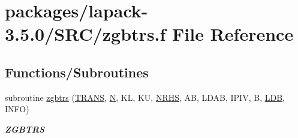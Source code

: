 \hypertarget{zgbtrs_8f}{}\section{packages/lapack-\/3.5.0/\+S\+R\+C/zgbtrs.f File Reference}
\label{zgbtrs_8f}
\subsection*{Functions/\+Subroutines}
\begin{DoxyCompactItemize}
\item 
subroutine \hyperlink{group__complex16GBcomputational_gaf3a96e7f621f139aa2750ae380e83700}{zgbtrs} (\hyperlink{superlu__enum__consts_8h_a0c4e17b2d5cea33f9991ccc6a6678d62a1f61e3015bfe0f0c2c3fda4c5a0cdf58}{T\+R\+A\+N\+S}, \hyperlink{polmisc_8c_a0240ac851181b84ac374872dc5434ee4}{N}, K\+L, K\+U, \hyperlink{example__user_8c_aa0138da002ce2a90360df2f521eb3198}{N\+R\+H\+S}, A\+B, L\+D\+A\+B, I\+P\+I\+V, B, \hyperlink{example__user_8c_a50e90a7104df172b5a89a06c47fcca04}{L\+D\+B}, I\+N\+F\+O)
\begin{DoxyCompactList}\small\item\em {\bfseries Z\+G\+B\+T\+R\+S} \end{DoxyCompactList}\end{DoxyCompactItemize}
